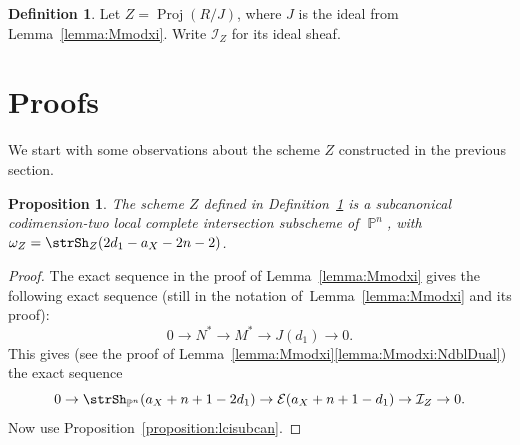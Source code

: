 \documentclass[11pt,a4paper]{amsart}
\theoremstyle{plain}
\newtheorem{proposition}[equation]{Proposition}
\theoremstyle{definition}
\newtheorem{definition}[equation]{Definition}
\newcommand{\calE}{\mathcal E}
\newcommand{\calI}{\mathcal I}
\DeclareMathOperator{\projective}{\mathbb{P}}
\DeclareMathOperator{\Proj}{Proj}
\begin{document}
\begin{definition}
\label{definition:Z}
Let $Z = \Proj(R/J)$, where $J$ is the ideal from
Lemma~\ref{lemma:Mmodxi}. Write $\calI_Z$ for its ideal sheaf.
\end{definition}

\section{Proofs}
\label{section:proofs}

We start with some observations about the scheme $Z$ constructed in the
previous section.

\begin{proposition}
\label{proposition:Zsubc}
The scheme $Z$ defined in Definition~\ref{definition:Z}
is a subcanonical codimension-two local complete intersection subscheme 
of $\projective^n$, with $\omega_Z = \strSh_Z(2d_1-a_X-2n-2)$.
\end{proposition}

\begin{proof}
%
The exact sequence in the proof of Lemma~\ref{lemma:Mmodxi} gives the
following exact sequence (still in the notation of~Lemma~\ref{lemma:Mmodxi}
and its proof):
\begin{equation}
\label{equation:NMJd1}
0 \to N^* \to M^* \to J(d_1) \to 0.
\end{equation}
This gives (see the proof of
Lemma~\ref{lemma:Mmodxi}\eqref{lemma:Mmodxi:NdblDual}) the exact sequence
\begin{equation}
\label{equation:sesForIZ}
0 \to \strSh_{\projective^n}(a_X + n + 1 -2d_1) \to \calE(a_X + n + 1-d_1)
\to \calI_Z \to 0.
\end{equation}
Now use Proposition~\ref{proposition:lcisubcan}.
\end{proof}
\end{document}
